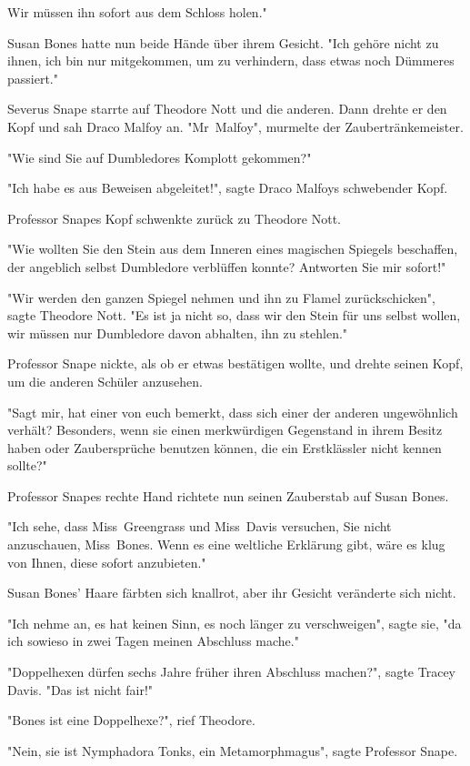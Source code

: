 {Wir müssen ihn sofort aus dem Schloss holen."

Susan Bones hatte nun beide Hände über ihrem Gesicht. "Ich gehöre nicht zu ihnen, ich bin nur mitgekommen, um zu verhindern, dass etwas noch Dümmeres passiert."

Severus Snape starrte auf Theodore Nott und die anderen. Dann drehte er den Kopf und sah Draco Malfoy an. "Mr~Malfoy", murmelte der Zaubertränkemeister.

"Wie sind Sie auf Dumbledores Komplott gekommen?"

"Ich habe es aus Beweisen abgeleitet!", sagte Draco Malfoys schwebender Kopf.

Professor Snapes Kopf schwenkte zurück zu Theodore Nott.

"Wie wollten Sie den Stein aus dem Inneren eines magischen Spiegels beschaffen, der angeblich selbst Dumbledore verblüffen konnte? Antworten Sie mir sofort!"

"Wir werden den ganzen Spiegel nehmen und ihn zu Flamel zurückschicken", sagte Theodore Nott. "Es ist ja nicht so, dass wir den Stein für uns selbst wollen, wir müssen nur Dumbledore davon abhalten, ihn zu stehlen."

Professor Snape nickte, als ob er etwas bestätigen wollte, und drehte seinen Kopf, um die anderen Schüler anzusehen.

"Sagt mir, hat einer von euch bemerkt, dass sich einer der anderen ungewöhnlich verhält? Besonders, wenn sie einen merkwürdigen Gegenstand in ihrem Besitz haben oder Zaubersprüche benutzen können, die ein Erstklässler nicht kennen sollte?"

Professor Snapes rechte Hand richtete nun seinen Zauberstab auf Susan Bones.

"Ich sehe, dass Miss~Greengrass und Miss~Davis versuchen, Sie nicht anzuschauen, Miss~Bones. Wenn es eine weltliche Erklärung gibt, wäre es klug von Ihnen, diese sofort anzubieten."

Susan Bones' Haare färbten sich knallrot, aber ihr Gesicht veränderte sich nicht.

"Ich nehme an, es hat keinen Sinn, es noch länger zu verschweigen", sagte sie, "da ich sowieso in zwei Tagen meinen Abschluss mache."

"Doppelhexen dürfen sechs Jahre früher ihren Abschluss machen?", sagte Tracey Davis. "Das ist nicht fair!"

"Bones ist eine Doppelhexe?", rief Theodore.

"Nein, sie ist Nymphadora Tonks, ein Metamorphmagus", sagte Professor Snape.

}
